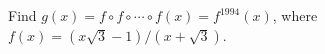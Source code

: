 Find $g(x) = f \circ f \circ \cdots \circ f(x) = f^{1994}(x)$, where $f(x) = (x\sqrt{3} - 1)/(x + \sqrt{3})$.

